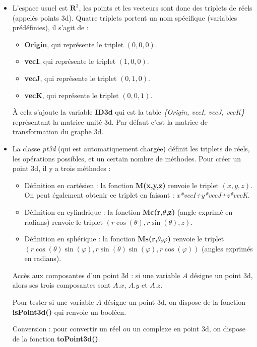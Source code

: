\begin{itemize}
    \item L'espace usuel est $\mathbf R^3$, les points et les vecteurs sont donc des triplets de réels (appelés points 3d). Quatre triplets portent un nom spécifique (variables prédéfinies), il s'agit de :
    \begin{itemize}
        \item \textbf{Origin}, qui représente le triplet $(0,0,0)$.
        \item \textbf{vecI}, qui représente le triplet $(1,0,0)$.
        \item \textbf{vecJ}, qui représente le triplet $(0,1,0)$.
        \item \textbf{vecK}, qui représente le triplet $(0,0,1)$.
    \end{itemize}
    À cela s'ajoute la variable \textbf{ID3d} qui est la table \emph{\{Origin, vecI, vecJ, vecK\}} représentant la matrice unité 3d. Par défaut c'est la matrice de transformation du graphe 3d.
    \item La classe \emph{pt3d} (qui est automatiquement chargée) définit les triplets de réels, les opérations possibles, et un certain nombre de méthodes. Pour créer un point 3d, il y a trois méthodes :
        \begin{itemize}
            \item Définition en cartésien : la fonction \textbf{M(x,y,z)} renvoie le triplet $(x,y,z)$. On peut également obtenir ce triplet en faisant : \emph{x*vecI+y*vecJ+z*vecK}.
            \item Définition en cylindrique : la fonction \textbf{Mc(r,$\theta$,z)} (angle exprimé en radians) renvoie le triplet $(r\cos(\theta),r\sin(\theta),z)$.
            \item Définition en sphérique : la fonction \textbf{Ms(r,$\theta$,$\varphi$)} renvoie le triplet $(r\cos(\theta)\sin(\varphi), r\sin(\theta)\sin(\varphi),r\cos(\varphi))$ (angles exprimés en radians).
        \end{itemize}
    Accès aux composantes d'un point 3d : si une variable $A$ désigne un point 3d, alors ses trois composantes sont $A.x$, $A.y$ et $A.z$.
    
    Pour tester si une variable $A$ désigne un point 3d, on dispose de la fonction \textbf{isPoint3d()} qui renvoie un booléen.
    
    Conversion : pour convertir un réel ou un complexe en point 3d, on dispose de la fonction \textbf{toPoint3d()}.
\end{itemize}

